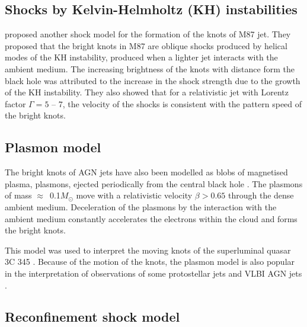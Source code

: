 \subsection{Shocks by Kelvin-Helmholtz (KH) instabilities}
 \citet{bicknell96} proposed another shock model for the formation of the knots of M87 jet. They proposed that the bright knots in M87 are oblique shocks produced by helical modes of the KH instability, produced when a lighter jet interacts with the ambient medium. The increasing brightness of the knots with distance form the black hole was attributed to the increase in the shock strength due to the growth of the KH instability. They also showed that for a relativistic jet with Lorentz factor $\Gamma=5$ -- 7, the velocity of the shocks is consistent with the pattern speed of the bright knots. 

\subsection{Plasmon model}
The bright knots of AGN jets have also been modelled as blobs of magnetised plasma, plasmons, ejected periodically from the central black hole \citep{shklovskii77, shklovskii80}. The plasmons of mass $\approx$~0.1$M_{\odot}$ move with a relativistic velocity $\beta >0.65$ through the dense ambient medium. Deceleration of the plasmons by the interaction with the ambient medium constantly accelerates the electrons within the cloud and forms the bright knots.  

This model was used to interpret the moving knots of the superluminal quasar 3C 345 \citep{qian92}. Because of the motion of the knots, the plasmon model is also popular in the interpretation of observations of some protostellar jets \citep{goodson97} and VLBI AGN jets \citep{hough13}.



\subsection{Reconfinement shock model}\label{sec:reconf}

